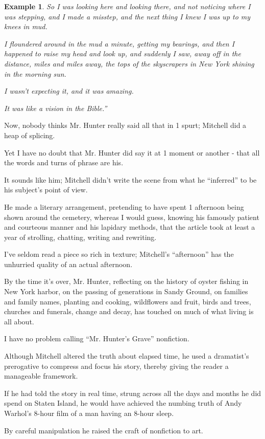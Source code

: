 \documentclass{book}
\numberwithin{equation}{section}
\newtheorem{example}{Example}[chapter]
\begin{document}
\begin{example}
    So I was looking here and looking there, and not noticing where I was stepping, and I made a misstep, and the next thing I knew I was up to my knees in mud.
    
    I floundered around in the mud a minute, getting my bearings, and then I happened to raise my head and look up, and suddenly I saw, away off in the distance, miles and miles away, the tops of the skyscrapers in New York shining in the morning sun.
    
    I wasn't expecting it, and it was amazing.
    
    It was like a vision in the Bible.''
\end{example}
Now, nobody thinks Mr. Hunter really said all that in 1 spurt; Mitchell did a heap of splicing.

Yet I have no doubt that Mr. Hunter did say it at 1 moment or another - that all the words and turns of phrase are his.

It sounds like him; Mitchell didn't write the scene from what he ``inferred'' to be his subject's point of view.

He made a literary arrangement, pretending to have spent 1 afternoon being shown around the cemetery, whereas I would guess, knowing his famously patient and courteous manner and his lapidary methods, that the article took at least a year of strolling, chatting, writing and rewriting.

I've seldom read a piece so rich in texture; Mitchell's ``afternoon'' has the unhurried quality of an actual afternoon.

By the time it's over, Mr. Hunter, reflecting on the history of oyster fishing in New York harbor, on the passing of generations in Sandy Ground, on families and family names, planting and cooking, wildflowers and fruit, birds and trees, churches and funerals, change and decay, has touched on much of what living is all about.

%
I have no problem calling ``Mr. Hunter's Grave'' nonfiction.

Although Mitchell altered the truth about elapsed time, he used a dramatist's prerogative to compress and focus his story, thereby giving the reader a manageable framework.

If he had told the story in real time, strung across all the days and months he did spend on Staten Island, he would have achieved the numbing truth of Andy Warhol's 8-hour film of a man having an 8-hour sleep.

By careful manipulation he raised the craft of nonfiction to art.
\end{document}
